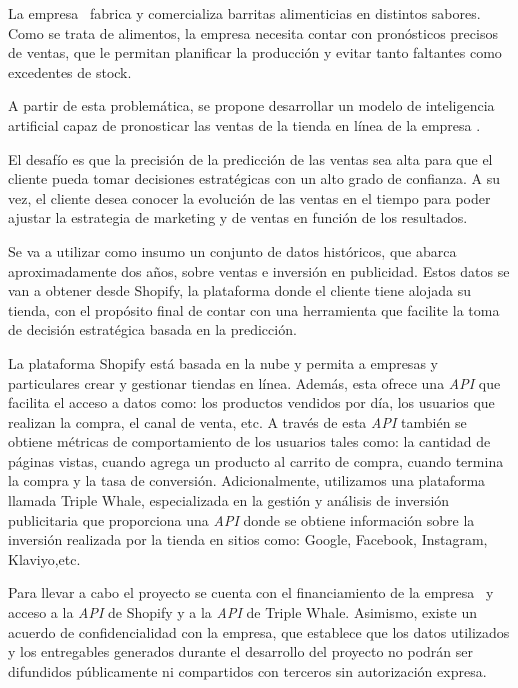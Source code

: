 \documentclass[
11pt, %
]{charter}
\begin{document}
La empresa \empclientename\ fabrica y comercializa barritas alimenticias en distintos sabores. 
Como se trata de alimentos, la empresa necesita contar con pronósticos precisos de ventas, que le permitan planificar la producción y evitar tanto faltantes como excedentes de stock.

A partir de esta problemática, se propone desarrollar un modelo de inteligencia artificial capaz de pronosticar las ventas de la tienda en línea de la empresa \empclientename. 

El desafío es que la precisión de la predicción de las ventas sea alta para que el cliente pueda tomar decisiones estratégicas con un alto grado de confianza. 
A su vez, el cliente desea conocer la evolución de las ventas en el tiempo para poder ajustar la estrategia de marketing y de ventas en función de los resultados.

Se va a utilizar como insumo un conjunto de datos históricos, que abarca aproximadamente dos años, sobre ventas e inversión en publicidad. 
Estos datos se van a obtener desde Shopify, la plataforma donde el cliente tiene alojada su tienda, con el propósito final de contar con una herramienta que facilite la toma de decisión estratégica basada en la predicción.

La plataforma Shopify está basada en la nube y permita a empresas y particulares crear y gestionar tiendas en línea. 
Además, esta ofrece una \textit{API} que facilita el acceso a datos como: los productos vendidos por día, los usuarios que realizan la compra, el canal de venta, etc. 
A través de esta \textit{API} también se obtiene métricas de comportamiento de los usuarios tales como: la cantidad de páginas vistas, cuando agrega un producto al carrito de compra, cuando termina la compra y la tasa de conversión.
Adicionalmente, utilizamos una plataforma llamada Triple Whale, especializada en la gestión y análisis de inversión publicitaria que proporciona una \textit{API} donde se obtiene información sobre la inversión realizada por la tienda en sitios como: Google, Facebook, Instagram, Klaviyo,etc.

Para llevar a cabo el proyecto se cuenta con el financiamiento de la empresa \empclientename\ y acceso a la \textit{API} de Shopify y a la \textit{API} de Triple Whale. 
Asimismo, existe un acuerdo de confidencialidad con la empresa, que establece que los datos utilizados y los entregables generados durante el desarrollo del proyecto no podrán ser difundidos públicamente ni compartidos con terceros sin autorización expresa.
\end{document}
